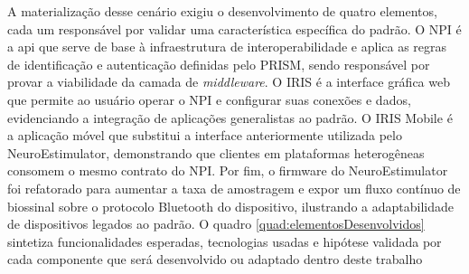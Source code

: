 A materialização desse cenário exigiu o desenvolvimento de quatro elementos, cada um responsável por validar uma característica específica do padrão. O NPI \cite{prismNpiRepo} é a \gls{api} que serve de base à infraestrutura de interoperabilidade e aplica as regras de identificação e autenticação definidas pelo PRISM, sendo responsável por provar a viabilidade da camada de \textit{middleware}. O IRIS \cite{prismIrisRepo} é a interface gráfica web que permite ao usuário operar o NPI e configurar suas conexões e dados, evidenciando a integração de aplicações generalistas ao padrão. O IRIS Mobile \cite{prismIrisMobileRepo} é a aplicação móvel que substitui a interface anteriormente utilizada pelo NeuroEstimulator, demonstrando que clientes em plataformas heterogêneas consomem o mesmo contrato do NPI. Por fim, o firmware do NeuroEstimulator \cite{prismNeuroEstimulatorRepo} foi refatorado para aumentar a taxa de amostragem e expor um fluxo contínuo de biossinal sobre o protocolo Bluetooth do dispositivo, ilustrando a adaptabilidade de dispositivos legados ao padrão. O quadro \ref{quad:elementosDesenvolvidos} sintetiza funcionalidades esperadas, tecnologias usadas e hipótese validada por cada componente que será desenvolvido ou adaptado dentro deste trabalho

